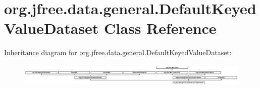 \hypertarget{classorg_1_1jfree_1_1data_1_1general_1_1_default_keyed_value_dataset}{}\section{org.\+jfree.\+data.\+general.\+Default\+Keyed\+Value\+Dataset Class Reference}
\label{classorg_1_1jfree_1_1data_1_1general_1_1_default_keyed_value_dataset}
Inheritance diagram for org.\+jfree.\+data.\+general.\+Default\+Keyed\+Value\+Dataset\+:\begin{figure}[H]
\begin{center}
\leavevmode
\includegraphics[height=1.070234cm]{classorg_1_1jfree_1_1data_1_1general_1_1_default_keyed_value_dataset}
\end{center}
\end{figure}
